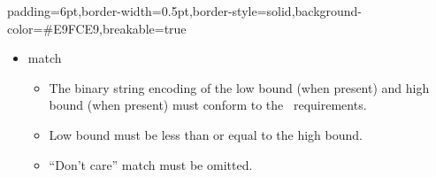 \documentclass[11pt]{article}
\begin{document}
{%
\begin{mdbmargintb}{6pt}{6pt}%
\begin{mdblock}{padding=6pt,border-width=0.5pt,border-style=solid,background-color=\#E9FCE9,breakable=true}%
\begin{mdpre}%
\end{mdpre}%
\end{mdblock}%
\end{mdbmargintb}%

\begin{itemize}[noitemsep,topsep=\mdcompacttopsep]%

\item{} match

\begin{itemize}[noitemsep,topsep=\mdcompacttopsep]%

\item{}The binary string encoding of the low bound (when present) and high bound
(when present) must conform to the~
requirements.%

\item{}Low bound must be less than or equal to the high bound.%

\item{}\textquotedblleft{}Don't care\textquotedblright{} match must be omitted.%
\end{itemize}%
\end{itemize}%

}
\end{document}
